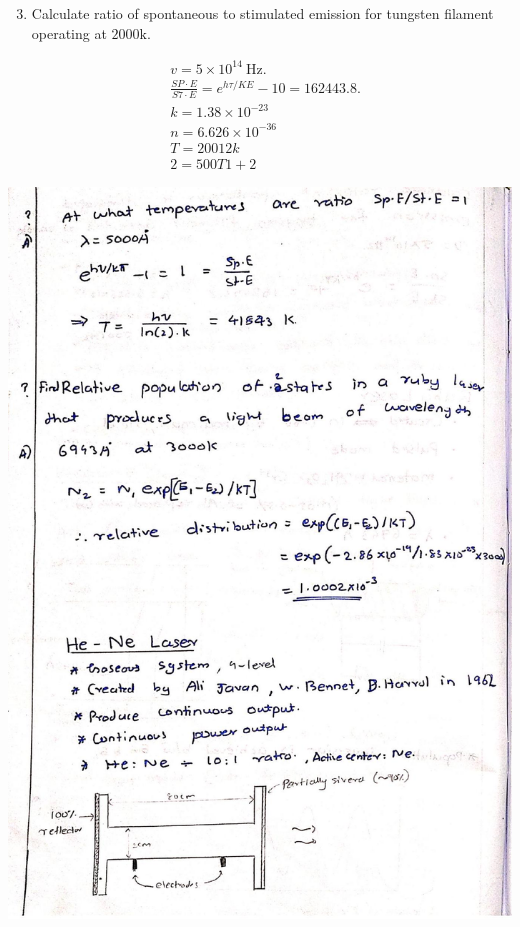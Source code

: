 \documentclass[10pt]{article}
\begin{document}
\begin{enumerate}
  \setcounter{enumi}{2}
  \item Calculate ratio of spontaneous to stimulated emission for tungsten filament operating at $2000 \mathrm{k}$.
\end{enumerate}

$$
\begin{aligned}
& v=5 \times 10^{14} \mathrm{~Hz} . \\
& \frac{S P \cdot E}{S 7 \cdot E}=e^{h \tau / K E}-10=162443.8 . \\
& k=1.38 \times 10^{-23} \\
& n=6.626 \times 10^{-36} \\
& T=20012 k \\
& 2=500 T 1+2
\end{aligned}
$$

\begin{center}
\includegraphics[max width=\textwidth]{2024_06_16_30d750483617f1939202g-04(1)}
\end{center}
\end{document}
